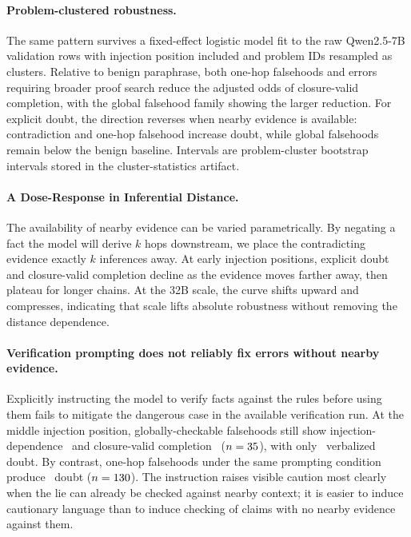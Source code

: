 \documentclass{article}
\begin{document}
\paragraph{Problem-clustered robustness.}
The same pattern survives a fixed-effect logistic model fit to the raw Qwen2.5-7B
validation rows with injection position included and problem IDs resampled as clusters.
Relative to benign paraphrase, both one-hop falsehoods and errors requiring broader
proof search reduce the adjusted odds of closure-valid completion, with the global
falsehood family showing the larger reduction. For explicit doubt, the direction
reverses when nearby evidence is available: contradiction and one-hop falsehood
increase doubt, while global falsehoods remain below the benign baseline. Intervals
are problem-cluster bootstrap intervals stored in the cluster-statistics artifact.

\paragraph{A Dose-Response in Inferential Distance.}
The availability of nearby evidence can be varied parametrically. By negating a fact
the model will derive $k$ hops downstream, we place the contradicting evidence exactly
$k$ inferences away. At early injection positions, explicit doubt and closure-valid
completion decline as the evidence moves farther away, then plateau for longer chains.
At the 32B scale, the curve shifts upward and compresses, indicating that scale lifts
absolute robustness without removing the distance dependence.

\paragraph{Verification prompting does not reliably fix errors without nearby evidence.}
Explicitly instructing the model to verify facts against the rules before using them
fails to mitigate the dangerous case in the available verification run. At the middle
injection position, globally-checkable falsehoods still show injection-dependence
\VerifyGlobalMidPoison\ and closure-valid completion \VerifyGlobalMidValid\
($n=35$), with only \VerifyGlobalMidDoubt\ verbalized doubt. By
contrast, one-hop falsehoods under the same prompting condition produce
\VerifyOneHopMidDoubt\ doubt ($n=130$). The instruction raises visible
caution most clearly when the lie can already be checked against nearby context; it is
easier to induce cautionary language than to induce checking of claims with no nearby
evidence against them.
\end{document}
